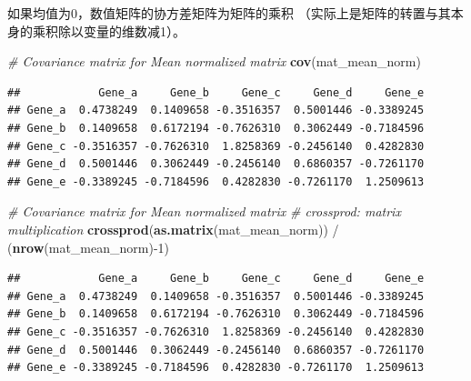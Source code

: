 \documentclass[]{article}
\newenvironment{Shaded}{\begin{snugshade}}{\end{snugshade}}
\newcommand{\KeywordTok}[1]{\textcolor[rgb]{0.13,0.29,0.53}{\textbf{{#1}}}}
\newcommand{\DecValTok}[1]{\textcolor[rgb]{0.00,0.00,0.81}{{#1}}}
\newcommand{\StringTok}[1]{\textcolor[rgb]{0.31,0.60,0.02}{{#1}}}
\newcommand{\CommentTok}[1]{\textcolor[rgb]{0.56,0.35,0.01}{\textit{{#1}}}}
\newcommand{\NormalTok}[1]{{#1}}
\numberwithin{figure}{section}
\numberwithin{table}{section}
\theoremstyle{definition}
\theoremstyle{definition}
\theoremstyle{definition}
\theoremstyle{remark}
\begin{document}
如果均值为0，数值矩阵的协方差矩阵为矩阵的乘积
（实际上是矩阵的转置与其本身的乘积除以变量的维数减1）。

\begin{Shaded}
\begin{Highlighting}[]
\CommentTok{# Covariance matrix for Mean normalized matrix}
\KeywordTok{cov}\NormalTok{(mat_mean_norm)}
\end{Highlighting}
\end{Shaded}

\begin{verbatim}
##            Gene_a     Gene_b     Gene_c     Gene_d     Gene_e
## Gene_a  0.4738249  0.1409658 -0.3516357  0.5001446 -0.3389245
## Gene_b  0.1409658  0.6172194 -0.7626310  0.3062449 -0.7184596
## Gene_c -0.3516357 -0.7626310  1.8258369 -0.2456140  0.4282830
## Gene_d  0.5001446  0.3062449 -0.2456140  0.6860357 -0.7261170
## Gene_e -0.3389245 -0.7184596  0.4282830 -0.7261170  1.2509613
\end{verbatim}

\begin{Shaded}
\begin{Highlighting}[]
\CommentTok{# Covariance matrix for Mean normalized matrix }
\CommentTok{# crossprod: matrix multiplication}
\KeywordTok{crossprod}\NormalTok{(}\KeywordTok{as.matrix}\NormalTok{(mat_mean_norm)) /}\StringTok{ }\NormalTok{(}\KeywordTok{nrow}\NormalTok{(mat_mean_norm)-}\DecValTok{1}\NormalTok{)}
\end{Highlighting}
\end{Shaded}

\begin{verbatim}
##            Gene_a     Gene_b     Gene_c     Gene_d     Gene_e
## Gene_a  0.4738249  0.1409658 -0.3516357  0.5001446 -0.3389245
## Gene_b  0.1409658  0.6172194 -0.7626310  0.3062449 -0.7184596
## Gene_c -0.3516357 -0.7626310  1.8258369 -0.2456140  0.4282830
## Gene_d  0.5001446  0.3062449 -0.2456140  0.6860357 -0.7261170
## Gene_e -0.3389245 -0.7184596  0.4282830 -0.7261170  1.2509613
\end{verbatim}

\begin{Shaded}
\end{Shaded}
\end{document}
